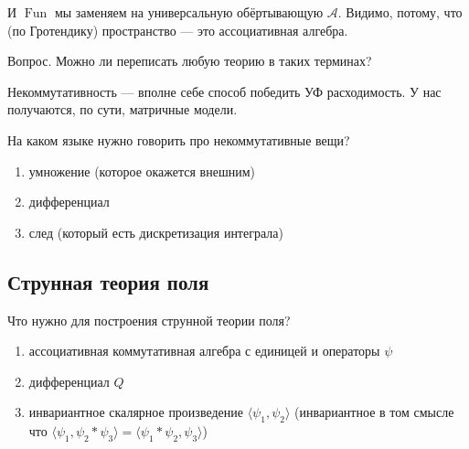 \documentclass[11pt]{article}
\def\ph{\varphi}
\theoremstyle{remark}
\theoremstyle{definition}
\renewcommand{\sqrt}[1][\ ]{%
  \def\DHLindex{#1}\mathpalette\DHLhksqrt}
\def\DHLhksqrt#1#2{%
  \setbox0=\hbox{$#1\oldsqrt[\DHLindex]{#2\,}$}\dimen0=\ht0
  \advance\dimen0-0.2\ht0
  \setbox2=\hbox{\vrule height\ht0 depth -\dimen0}%
  {\box0\lower0.71pt\box2}}
\begin{document}
И $\operatorname{Fun}$ мы заменяем на универсальную обёртывающую $\mathcal{A}$. Видимо, потому, что (по Гротендику) пространство --- это ассоциативная алгебра.

\footnotesize{}

Вопрос. Можно ли переписать любую теорию в таких терминах?

\normalsize{}

Некоммутативность --- вполне себе способ победить УФ расходимость. У нас получаются, по сути, матричные модели.

\begin{center}
\end{center}

На каком языке нужно говорить про некоммутативные вещи?

\begin{enumerate}
\item умножение (которое окажется внешним)
\item дифференциал
\item след (который есть дискретизация интеграла)
\end{enumerate}

\subsection{Струнная теория поля}

Что нужно для построения струнной теории поля?

\begin{enumerate}
\item ассоциативная коммутативная алгебра с единицей и операторы $\psi$
\item дифференциал $Q$
\item инвариантное скалярное произведение $\langle \psi_1, \psi_2 \rangle$ (инвариантное в том смысле что $\langle \psi_1, \psi_2 * \psi_3 \rangle = \langle \psi_1 * \psi_2, \psi_3 \rangle$)
\end{enumerate}
\end{document}

